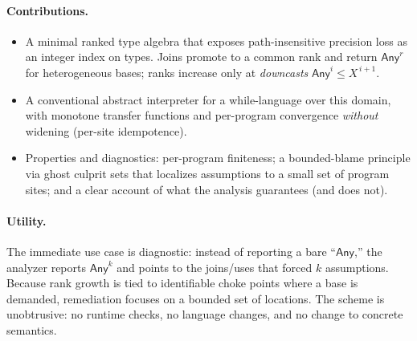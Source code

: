 \paragraph{Contributions.}
\begin{itemize}
  \item A minimal ranked type algebra that exposes path-insensitive precision loss as an integer index on types. Joins promote to a common rank and return \(\mathsf{Any}^{r}\) for heterogeneous bases; ranks increase only at \emph{downcasts} \(\mathsf{Any}^{i}\le X^{\,i+1}\).
  \item A conventional abstract interpreter for a while-language over this domain, with monotone transfer functions and per-program convergence \emph{without} widening (per-site idempotence).
  \item Properties and diagnostics: per-program finiteness; a bounded-blame principle via ghost culprit sets that localizes assumptions to a small set of program sites; and a clear account of what the analysis guarantees (and does not).
\end{itemize}

\paragraph{Utility.}
The immediate use case is diagnostic: instead of reporting a bare “\(\mathsf{Any}\),” the analyzer reports \(\mathsf{Any}^{k}\) and points to the joins/uses that forced \(k\) assumptions.
Because rank growth is tied to identifiable choke points where a base is demanded, remediation focuses on a bounded set of locations.
The scheme is unobtrusive: no runtime checks, no language changes, and no change to concrete semantics.
